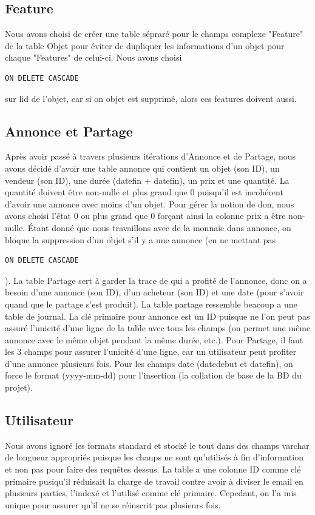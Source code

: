 \documentclass[a4paper,12pt]{article}
\begin{document}
\begin{spacing}{1}
	\subsection*{Feature}
	Nous avons choisi de créer une table sépraré pour le champs complexe "Feature" de la table Objet pour éviter de dupliquer les informations d'un objet pour chaque "Features" de celui-ci. Nous avons choisi \begin{verbatim}ON DELETE CASCADE\end{verbatim} sur lid de l'objet, car si on objet est supprimé, alors ces features doivent aussi.
	\subsection*{Annonce et Partage}
	Après avoir passé à travers plusieurs itérations d'Annonce et de Partage, nous avons décidé d'avoir une table annonce qui contient un objet (son ID), un vendeur (son ID), une  durée (datefin + datefin), un prix et une quantité. La quantité doivent être non-nulle et plus grand que 0 puisqu'il est incohérent d'avoir une annonce avec moins d'un objet. Pour gérer la notion de don, nous avons choisi l'état 0 ou plus grand que 0 forçant ainsi la colonne prix a être non-nulle. Étant donné que nous travaillons avec de la monnaie dans annonce, on bloque la suppression d'un objet s'il y a une annonce (en ne mettant pas \begin{verbatim}ON DELETE CASCADE\end{verbatim}). La table Partage sert à garder la trace de qui a profité de l'annonce, donc on a besoin d'une annonce (son ID), d'un acheteur (son ID) et une date (pour s'avoir quand que le partage s'est produit). La table partage ressemble beacoup a une table de journal. La clé primaire pour annonce est un ID puisque ne l'on peut pas assuré l'unicité d'une ligne de la table avec tous les champs (on permet une même annonce avec le même objet pendant la même durée, etc.). Pour Partage, il faut les 3 champs pour assurer l'unicité d'une ligne, car un utilisateur peut profiter d'une annonce plusieurs fois. Pour les champs date (datedebut et datefin), on force le format (yyyy-mm-dd) pour l'insertion (la collation de base de la BD du projet).
	\subsection*{Utilisateur}
	Nous avons ignoré les formats standard et stocké le tout dans des champs varchar de longueur appropriés puisque les chanps ne sont qu'utilisés à fin d'information et non pas pour faire des requêtes dessus. La table a une colonne ID comme clé primaire pusiqu'il réduisait la charge de travail contre avoir à diviser le email en plusieurs parties, l'indexé et l'utilisé comme clé primaire. Cepedant, on l'a mis unique pour assurer qu'il ne se réinscrit pas plusieurs fois.

\end{spacing}
\end{document}
